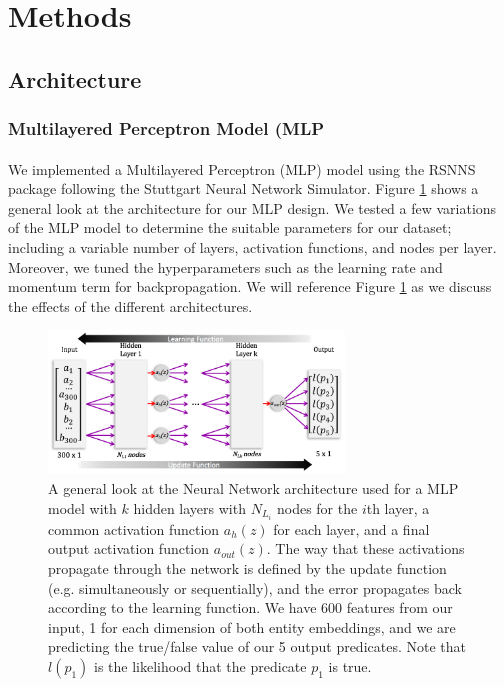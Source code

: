 \documentclass[11.5pt]{article}
\newcounter{Figure}
\newcounter{graphics}
\begin{document}
\section{Methods}
\subsection{Architecture}
\subsubsection{Multilayered Perceptron Model (MLP}
\paragraph{}We implemented a Multilayered Perceptron (MLP) model using the RSNNS package following the Stuttgart Neural Network Simulator\cite{RSNNS}. Figure \ref{MLPArch} shows a general look at the architecture for our MLP design. We tested a few variations of the MLP model to determine the suitable parameters for our dataset; including a variable number of layers, activation functions, and nodes per layer. Moreover, we tuned the hyperparameters such as the learning rate and momentum term for backpropagation. We will reference Figure \ref{MLPArch} as we discuss the effects of the different architectures. 


\begin{figure}[h!]
\centerline { \includegraphics[width=0.7\textwidth]{report_mlp/GenArchitecture.png}}
  \caption{\small A general look at the Neural Network architecture used for a MLP model with $k$ hidden layers with $N_{L_i}$ nodes for the $i$th layer, a common activation function $a_h(z)$ for each layer, and a final output activation function $a_{out}(z)$. The way that these activations propagate through the network is defined by the update function (e.g. simultaneously or sequentially), and the error propagates back according to the learning function. We have 600 features from our input, 1 for each dimension of both entity embeddings, and we are predicting the true/false value of our 5 output predicates. Note that $l(p_1)$ is the likelihood that the predicate $p_1$ is true.  }
  \label{MLPArch}
\end{figure}
\end{document}
